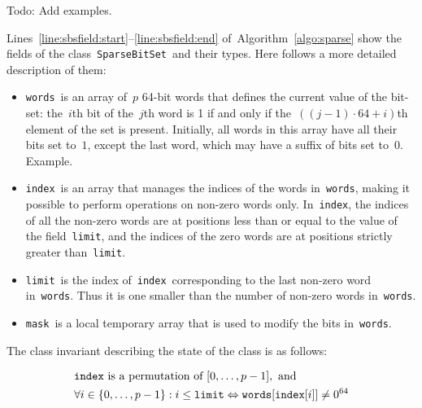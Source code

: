 \documentclass[a4paper,11pt]{article}
\newcommand{\Todo}[1]{{\color{blue}#1}}
\newcommand{\Algoref}[1]{Algorithm~\ref{#1}}
\newcommand{\Linesref}[2]{Lines~\ref{#1}--\ref{#2}}
\newcommand{\Words}{\texttt{words}}
\newcommand{\Index}{\texttt{index}}
\newcommand{\Mask}{\texttt{mask}}
\newcommand{\Limit}{\texttt{limit}}
\newcommand{\SparseBitSet}{\texttt{SparseBitSet}}
\numberwithin{equation}{section}
\begin{document}
\Todo{Todo: Add examples.}

\Linesref{line:sbsfield:start}{line:sbsfield:end} of~\Algoref{algo:sparse} show the fields
of the class~\SparseBitSet~and their types. Here follows a more detailed description of them:

\begin{itemize}
  \item \Words~is an array of~$p$ 64-bit words that defines the current value of the bit-set:
    the~$i$th bit of the~$j$th word is 1 if and only if 
    the~$\left((j-1) \cdot 64 + i\right)$th element of
    the set is present. Initially, all words in this array have all their bits set to~$1$,
    except the last word, which may have a suffix of bits set to~$0$. \Todo{Example.}

  \item \Index~is an array that manages the indices of the words in~\Words,
    making it possible to perform operations on non-zero words only.
    In~\Index, the
    indices of all the non-zero words are at positions less than or
    equal to the value of the field~\Limit, and the indices of the zero words are
    at positions strictly greater than~\Limit. 

  \item \Limit~is the index of~\Index~corresponding to the last non-zero word in~\Words.
    Thus it is one smaller than the number of non-zero words in~\Words.

  \item \Mask~is a local temporary array that is used to modify the bits in~\Words.

\end{itemize}

\noindent
The class invariant describing the state of the class is as follows:

\begin{alignat}{1}
  \label{eq:invariant}
  &\Index~\text{is a permutation of~} [0,\dots,p-1],\text{~and} \\
  &\forall i \in \Set{0,\dots,p-1}: i \leq \Limit \Leftrightarrow \Words[\Index[i]] \neq 0^{64}
\end{alignat}

\end{document}
